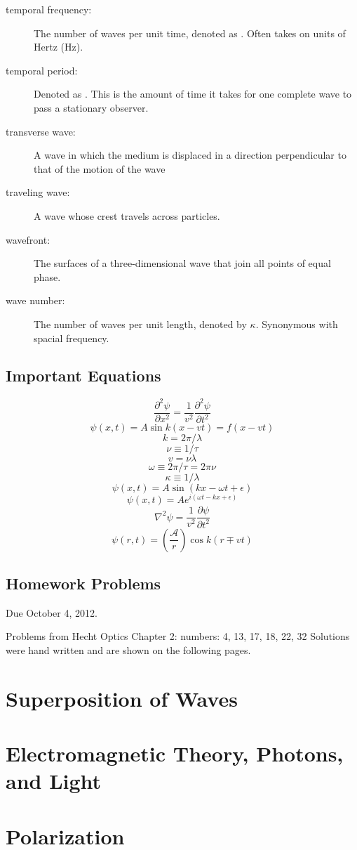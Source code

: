 \documentclass[12pt]{report}
\begin{document}
\begin{description}
\item[temporal frequency:] The number of waves per unit time, denoted as \textnu. Often takes on units of Hertz (Hz). 
\item[temporal period:] Denoted as \texttau. This is the amount of time it takes for one complete wave to pass a stationary observer.
\item[transverse wave:] A wave in which the medium is displaced in a direction perpendicular to that of the motion of the wave
\item[traveling wave:] A wave whose crest travels across particles.
\item[wavefront:] The surfaces of a three-dimensional wave that join all points of equal phase. 
\item[wave number:] The number of waves per unit length, denoted by $\kappa$. Synonymous with spacial frequency. 
\end{description}
\section{Important Equations}
\[\frac{\partial ^2\psi}{\partial x^2} = \frac{1}{v^2}\frac{\partial ^2\psi}{\partial t^2}\]
\[\psi(x,t) = A\sin k(x-vt) = f(x-vt)\]
\[k = 2\pi /\lambda\]
\[\nu \equiv 1/\tau\]
\[v = \nu\lambda\]
\[\omega \equiv 2\pi/\tau = 2\pi\nu\]
\[\kappa \equiv 1/\lambda\]
\[\psi(x,t) = A \sin (kx-\omega t +\epsilon)\]
\[\psi(x,t) = Ae^{i(\omega t -kx+\epsilon)}\]
\[\nabla^2 \psi = \frac{1}{v^2}\frac{\partial\psi}{\partial t^2}\]
\[\psi (r,t) = \left( \frac{\mathcal{A}}{r} \right)\cos k(r \mp vt )\]

\section{Homework Problems}

Due October 4, 2012.

Problems from Hecht Optics Chapter 2: numbers: 4, 13, 17, 18, 22, 32
Solutions were hand written and are shown on the following pages. 



\chapter{Superposition of Waves}
\chapter{Electromagnetic Theory, Photons, and Light}
\chapter{Polarization}
\end{document}
